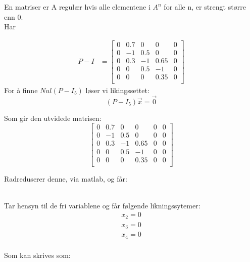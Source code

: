 \documentclass[a4paper, norsk, twoside, 10pt]{article}
\begin{document}
\begin{flushleft}
  En matriser er A regulær hvis alle elementene i $A^{n}$ for alle n, er strengt større enn 0.
  \ \\
  Har
  \def\PI{
    \begin{bmatrix}
      0 & 0.7 & 0 & 0 & 0 \\
      0 & -1   & 0.5 & 0 & 0 \\
      0 & 0.3 & -1 & 0.65 & 0 \\
      0 & 0   & 0.5 & -1 & 0 \\
      0 & 0 & 0 & 0.35 & 0 \\
    \end{bmatrix}
  }


  \begin{align*}
    P -I &= \PI
  \end{align*}
  For å finne $Nul(P - I_{5})$ løser vi likingssettet:
  \[(P-I_{5}) \vec{x} = \vec{0} \]

  Som gir den utvidede matrisen:
  \[  \begin{bmatrix}
    0 & 0.7 & 0 & 0 & 0 & 0\\
    0 & -1   & 0.5 & 0 & 0 & 0\\
    0 & 0.3 & -1 & 0.65 & 0 & 0\\
    0 & 0   & 0.5 & -1 & 0 & 0\\
    0 & 0 & 0 & 0.35 & 0 & 0\\
  \end{bmatrix}\]

  Radreduserer denne, via matlab, og får:
  
  \ \\
  

  Tar hensyn til de fri variablene og får følgende likningssytemer:
  \begin{align*}
    x_{2} = 0 \\
    x_{3} = 0 \\
    x_{4} = 0 \\
  \end{align*}

  Som kan skrives som:


\end{flushleft}
\end{document}
